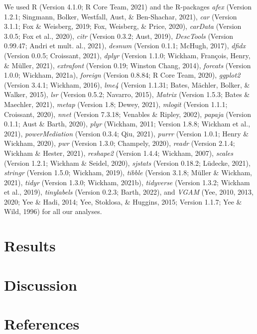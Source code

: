 \documentclass[
  man]{apa6}
\begin{document}
We used R (Version 4.1.0; R Core Team, 2021) and the R-packages \emph{afex} (Version 1.2.1; Singmann, Bolker, Westfall, Aust, \& Ben-Shachar, 2021), \emph{car} (Version 3.1.1; Fox \& Weisberg, 2019; Fox, Weisberg, \& Price, 2020), \emph{carData} (Version 3.0.5; Fox et al., 2020), \emph{citr} (Version 0.3.2; Aust, 2019), \emph{DescTools} (Version 0.99.47; Andri et mult. al., 2021), \emph{desnum} (Version 0.1.1; McHugh, 2017), \emph{dfidx} (Version 0.0.5; Croissant, 2021), \emph{dplyr} (Version 1.1.0; Wickham, François, Henry, \& Müller, 2021), \emph{extrafont} (Version 0.19; Winston Chang, 2014), \emph{forcats} (Version 1.0.0; Wickham, 2021a), \emph{foreign} (Version 0.8.84; R Core Team, 2020), \emph{ggplot2} (Version 3.4.1; Wickham, 2016), \emph{lme4} (Version 1.1.31; Bates, Mächler, Bolker, \& Walker, 2015), \emph{lsr} (Version 0.5.2; Navarro, 2015), \emph{Matrix} (Version 1.5.3; Bates \& Maechler, 2021), \emph{metap} (Version 1.8; Dewey, 2021), \emph{mlogit} (Version 1.1.1; Croissant, 2020), \emph{nnet} (Version 7.3.18; Venables \& Ripley, 2002), \emph{papaja} (Version 0.1.1; Aust \& Barth, 2020), \emph{plyr} (Wickham, 2011; Version 1.8.8; Wickham et al., 2021), \emph{powerMediation} (Version 0.3.4; Qiu, 2021), \emph{purrr} (Version 1.0.1; Henry \& Wickham, 2020), \emph{pwr} (Version 1.3.0; Champely, 2020), \emph{readr} (Version 2.1.4; Wickham \& Hester, 2021), \emph{reshape2} (Version 1.4.4; Wickham, 2007), \emph{scales} (Version 1.2.1; Wickham \& Seidel, 2020), \emph{sjstats} (Version 0.18.2; Lüdecke, 2021), \emph{stringr} (Version 1.5.0; Wickham, 2019), \emph{tibble} (Version 3.1.8; Müller \& Wickham, 2021), \emph{tidyr} (Version 1.3.0; Wickham, 2021b), \emph{tidyverse} (Version 1.3.2; Wickham et al., 2019), \emph{tinylabels} (Version 0.2.3; Barth, 2022), and \emph{VGAM} (Yee, 2010, 2013, 2020; Yee \& Hadi, 2014; Yee, Stoklosa, \& Huggins, 2015; Version 1.1.7; Yee \& Wild, 1996) for all our analyses.

\hypertarget{results}{%
\section{Results}\label{results}}

\hypertarget{discussion}{%
\section{Discussion}\label{discussion}}

\newpage

\hypertarget{references}{%
\section{References}\label{references}}
\end{document}
